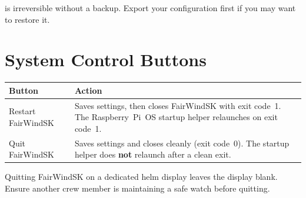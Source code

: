\begin{warningbox}
 is irreversible without a backup.
Export your configuration first if you may want to restore it.
\end{warningbox}

\section{System Control Buttons}

\begin{longtable}{L{3.2cm}L{10.5cm}}
\toprule
{}
\color{white}\sffamily\bfseries Button &
\color{white}\sffamily\bfseries Action \\
\midrule
Restart FairWindSK &
  Saves settings, then closes FairWindSK with exit code~1.
  The Raspberry~Pi~OS startup helper relaunches on exit code~1. \\
Quit FairWindSK &
  Saves settings and closes cleanly (exit code~0).
  The startup helper does \textbf{not} relaunch after a clean exit. \\
\bottomrule
\end{longtable}

\begin{warningbox}
Quitting FairWindSK on a dedicated helm display leaves the display blank.
Ensure another crew member is maintaining a safe watch before quitting.
\end{warningbox}
